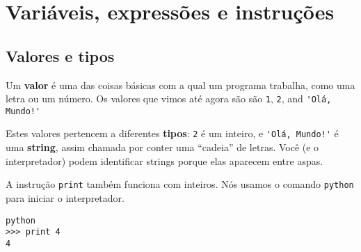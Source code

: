 
\chapter{Variáveis, expressões e instruções}
\section{Valores e tipos}



Um {\bf valor} é uma das coisas básicas com a qual um programa trabalha, 
como uma letra ou um número. Os valores que vimos até agora são
são {\tt 1}, {\tt 2}, and \verb"'Olá, Mundo!'"

Estes valores pertencem a diferentes {\bf tipos}:
{\tt 2} é um inteiro, e \verb"'Olá, Mundo!'" é uma {\bf string},
assim chamada por conter uma ``cadeia'' de letras.
Você (e o interpretador) podem identificar strings 
porque elas aparecem entre aspas.


A instrução {\tt print} também funciona com inteiros. Nós usamos o 
comando {\tt python} para iniciar o interpretador.

\beforeverb
\begin{verbatim}
python
>>> print 4
4
\end{verbatim}
\afterverb
%

